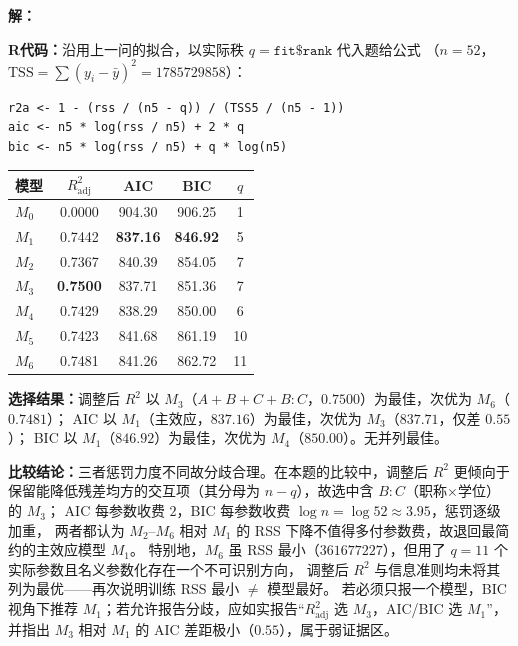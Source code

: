 \documentclass[12pt,a4paper]{article}
\begin{document}
\begin{answerbox}
\textbf{解：}

\textbf{R代码：}沿用上一问的拟合，以实际秩 $q=\texttt{fit\$rank}$ 代入题给公式
（$n=52$，$\mathrm{TSS}=\sum(y_i-\bar{y})^2=1785729858$）：
\begin{lstlisting}[style=rcode]
r2a <- 1 - (rss / (n5 - q)) / (TSS5 / (n5 - 1))
aic <- n5 * log(rss / n5) + 2 * q
bic <- n5 * log(rss / n5) + q * log(n5)
\end{lstlisting}

\begin{center}
\small
\begin{tabular}{lcccc}
\toprule
模型 & $R^2_{\mathrm{adj}}$ & AIC & BIC & $q$ \\
\midrule
$M_0$ & 0.0000 & 904.30 & 906.25 & 1 \\
$M_1$ & 0.7442 & \textbf{837.16} & \textbf{846.92} & 5 \\
$M_2$ & 0.7367 & 840.39 & 854.05 & 7 \\
$M_3$ & \textbf{0.7500} & 837.71 & 851.36 & 7 \\
$M_4$ & 0.7429 & 838.29 & 850.00 & 6 \\
$M_5$ & 0.7423 & 841.68 & 861.19 & 10 \\
$M_6$ & 0.7481 & 841.26 & 862.72 & 11 \\
\bottomrule
\end{tabular}
\end{center}

\textbf{选择结果：}调整后 $R^2$ 以 $M_3$（$A{+}B{+}C{+}B{:}C$，$0.7500$）为最佳，次优为 $M_6$（$0.7481$）；
AIC 以 $M_1$（主效应，$837.16$）为最佳，次优为 $M_3$（$837.71$，仅差 $0.55$）；
BIC 以 $M_1$（$846.92$）为最佳，次优为 $M_4$（$850.00$）。无并列最佳。

\textbf{比较结论：}三者惩罚力度不同故分歧合理。在本题的比较中，调整后 $R^2$ 更倾向于保留能降低残差均方的交互项（其分母为 $n-q$），故选中含 $B{:}C$（职称$\times$学位）的 $M_3$；
AIC 每参数收费 $2$，BIC 每参数收费 $\log n=\log 52\approx 3.95$，惩罚逐级加重，
两者都认为 $M_2$--$M_6$ 相对 $M_1$ 的 RSS 下降不值得多付参数费，故退回最简约的主效应模型 $M_1$。
特别地，$M_6$ 虽 RSS 最小（$361677227$），但用了 $q=11$ 个实际参数且名义参数化存在一个不可识别方向，
调整后 $R^2$ 与信息准则均未将其列为最优——再次说明训练 RSS 最小 $\neq$ 模型最好。
若必须只报一个模型，BIC 视角下推荐 $M_1$；若允许报告分歧，应如实报告``$R^2_{\mathrm{adj}}$ 选 $M_3$，AIC/BIC 选 $M_1$''，
并指出 $M_3$ 相对 $M_1$ 的 AIC 差距极小（$0.55$），属于弱证据区。
\end{answerbox}
\end{document}
